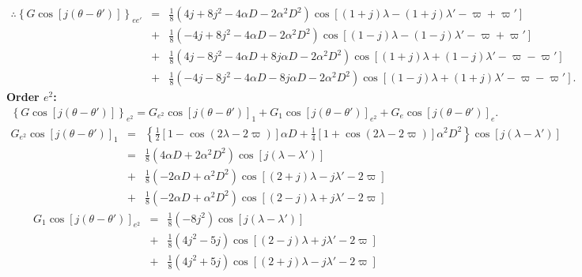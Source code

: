 \documentclass [12pt, a4paper] {article}
\begin{document}
\begin {eqnarray}
    \therefore
    \left\{G\cos[j(\theta - \theta')]\right\}_{ee'}
    &=&
    \frac{1}{8}
    \left(
        4j + 8j^2 - 4\alpha D - 2\alpha^2D^2
    \right)
    \cos[(1+j)\lambda - (1+j)\lambda' - \varpi + \varpi']
    \quad\quad
    \\\nonumber
    &+&
    \frac{1}{8}
    \left(
        -4j + 8j^2 - 4\alpha D - 2\alpha^2D^2
    \right)
    \cos[(1-j)\lambda - (1-j)\lambda' - \varpi + \varpi']
    \\\nonumber
    &+&
    \frac{1}{8}
    \left(
        4j - 8j^2 - 4\alpha D + 8j\alpha D - 2\alpha^2D^2
    \right)
    \cos[(1+j)\lambda + (1-j)\lambda' - \varpi - \varpi']
    \\\nonumber
    &+&
    \frac{1}{8}
    \left(
        -4j -8j^2 - 4\alpha D - 8j\alpha D - 2\alpha^2D^2
    \right)
    \cos[(1-j)\lambda + (1+j)\lambda' - \varpi - \varpi'].
\end {eqnarray}
\newpage
\textbf{Order $e^2$:}
\begin {eqnarray}
    \left\{G\cos[j(\theta - \theta')]\right\}_{e^2}
    =
    G_{e^2}\cos[j(\theta - \theta')]_1
    +
    G_{1}\cos[j(\theta - \theta')]_{e^2}
    +
    G_{e}\cos[j(\theta - \theta')]_{e}.
\end {eqnarray}
\begin {eqnarray}
    \nonumber
    G_{e^2}\cos[j(\theta - \theta')]_1
    &=&
    \left\{
    \frac{1}{2}
    \left[
        1 - \cos(2\lambda - 2\varpi)
    \right]\alpha D
    +
    \frac{1}{4}
    \left[
        1 + \cos(2\lambda - 2\varpi)
    \right]
    \alpha^2D^2    
    \right\}
    \cos[j(\lambda - \lambda')]
    \\
    &=& 
    \frac{1}{8}\left(4\alpha D + 2\alpha^2D^2\right)\cos[j(\lambda - \lambda')]
    \\\nonumber
    &+& 
    \frac{1}{8}\left(- 2\alpha D + \alpha^2D^2\right)
    \cos[(2 + j)\lambda - j\lambda' - 2\varpi]
    \\\nonumber
    &+& 
    \frac{1}{8}\left(- 2\alpha D + \alpha^2D^2\right)
    \cos[(2 - j)\lambda + j\lambda' - 2\varpi]
\end {eqnarray}
\begin {eqnarray}
    G_1\cos[j(\theta - \theta')]_{e^2}
    &=& 
    \frac{1}{8}(-8j^2)\cos[j(\lambda - \lambda')]
    \\\nonumber 
    &+&
    \frac{1}{8}
    \left(4j^2 - 5j\right)\cos[(2-j)\lambda + j\lambda' - 2\varpi]
    \\\nonumber 
    &+&
    \frac{1}{8}
    \left(4j^2 + 5j\right)\cos[(2+j)\lambda - j\lambda' - 2\varpi]
    \\\nonumber 
\end {eqnarray}
\end{document}
